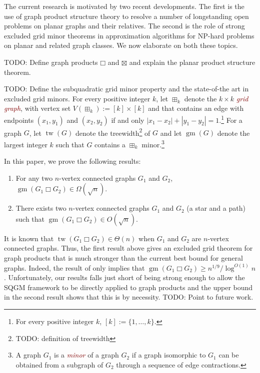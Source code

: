 \documentclass[12pt]{article}
\newcommand{\defn}[1]{\textcolor{Maroon}{\emph{#1}}}
\newcommand{\boxprod}{\mathbin{\Box}}
\renewcommand{\ge}{\geqslant}
\DeclareMathOperator{\tw}{tw}
\DeclareMathOperator{\gm}{gm}
\theoremstyle{plain}
\theoremstyle{definition}
\begin{document}
The current research is motivated by two recent developments. The first is the use of graph product structure theory to resolve a number of longstanding open problems on planar graphs and their relatives.  The second is the role of strong excluded grid minor theorems in approximation algorithms for NP-hard problems on planar and related graph classes.  We now elaborate on both these topics.

TODO: Define graph products $\boxprod$ and $\boxtimes$ and explain the planar product structure theorem.

TODO: Define the subquadratic grid minor property and the state-of-the art in excluded grid minors.
For every positive integer $k$, let $\boxplus_k$ denote the $k\times k$ \defn{grid graph}, with vertex set $V(\boxplus_k):=[k]\times[k]$ and that contains an edge with endpoints $(x_1,y_1)$ and $(x_2,y_2)$ if and only $|x_1-x_2| + |y_1-y_2|=1$.\footnote{For every positive integer $k$, $[k]:=\{1,\ldots,k\}$.}  For a graph $G$, let $\tw(G)$ denote the treewidth\footnote{TODO: definition of treewidth} of $G$ and let $\gm(G)$ denote the largest integer $k$ such that $G$ contains a $\boxplus_k$ minor.\footnote{A graph $G_1$ is a \defn{minor} of a graph $G_2$ if a graph isomorphic to $G_1$ can be obtained from a subgraph of $G_2$ through a sequence of edge contractions.}

In this paper, we prove the following results:

\begin{enumerate}
   \item  For any two $n$-vertex connected graphs $G_1$ and $G_2$, $\gm(G_1\boxprod G_2) \in \Omega(\sqrt{n})$.
   \item There exists two $n$-vertex connected graphs $G_1$ and $G_2$ (a star and a path) such that $\gm(G_1\boxprod G_2) \in O(\sqrt{n})$.
\end{enumerate}

It is known that $\tw(G_1\boxprod G_2)\in\Theta(n)$ when $G_1$ and $G_2$ are $n$-vertex connected graphs.  Thus, the first result above gives an excluded grid theorem for graph products that is much stronger than the current best bound for general graphs. Indeed, the result of \cite{CT19} only implies that $\gm(G_1\boxprod G_2) \ge n^{1/9}/\log^{O(1)} n$.  Unfortunately, our results falls just short of being strong enough to allow the SQGM framework to be directly applied to graph products and the upper bound in the second result shows that this is by necessity.  TODO: Point to future work.
\end{document}
